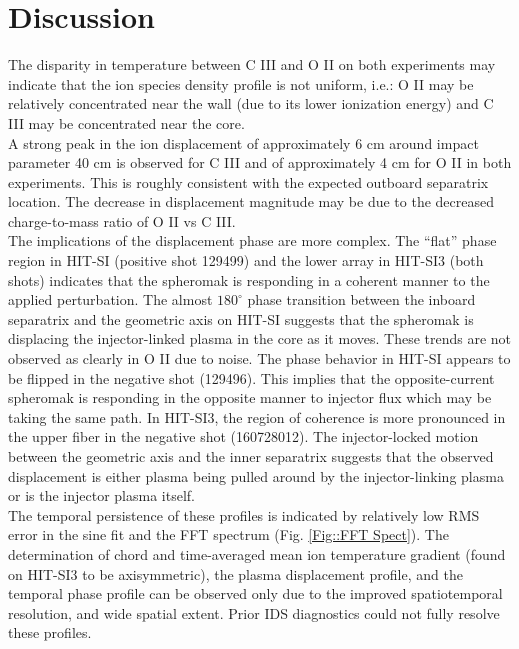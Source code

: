 \section{Discussion}
\hspace{4ex}The disparity in temperature between C III and O II on both experiments may indicate that the ion species density profile is not uniform, i.e.: O II may be relatively concentrated near the wall (due to its lower ionization energy) and C III may be concentrated near the core.  \\
\hspace*{4ex}A strong peak in the ion displacement of approximately 6 cm around impact parameter 40 cm is observed for C III and of approximately 4 cm for O II in both experiments. This is roughly consistent with the expected outboard separatrix location\cite{hossack2015study}. The decrease in displacement magnitude may be due to the decreased charge-to-mass ratio of O II vs C III. \\
\hspace*{4ex}The implications of the displacement phase are more complex. The ``flat'' phase region in HIT-SI (positive shot 129499) and the lower array in HIT-SI3 (both shots) indicates that the spheromak is responding in a coherent manner to the applied perturbation. The almost $180^\circ$ phase transition between the inboard separatrix and the geometric axis on HIT-SI suggests that the spheromak is displacing the injector-linked plasma in the core as it moves. These trends are not observed as clearly in O II due to noise. The phase behavior in HIT-SI appears to be flipped in the negative shot (129496). This implies that the opposite-current spheromak is responding in the opposite manner to injector flux which may be taking the same path. In HIT-SI3, the region of coherence is more pronounced in the upper fiber in the negative shot (160728012). The injector-locked motion between the geometric axis and the inner separatrix suggests that the observed displacement is either plasma being pulled around by the injector-linking plasma or is the injector plasma itself.\\
\hspace*{4ex}The temporal persistence of these profiles is indicated by relatively low RMS error in the sine fit and the FFT spectrum (Fig. \ref{Fig::FFT Spect}). The determination of chord and time-averaged mean ion temperature gradient (found on HIT-SI3 to be axisymmetric), the plasma displacement profile, and the temporal phase profile can be observed only due to the improved spatiotemporal resolution, and wide spatial extent. Prior IDS diagnostics could not fully resolve these profiles.

